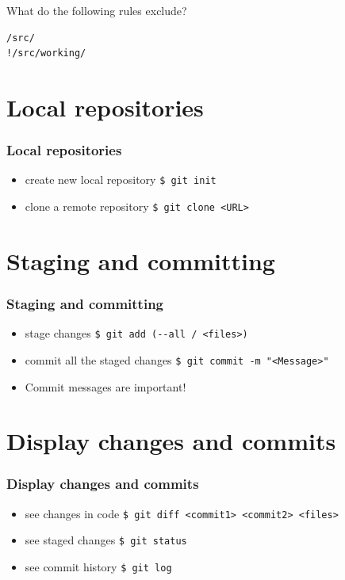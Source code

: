 \documentclass{beamer}
\begin{document}
	\begin{frame}[fragile]
		\centering What do the following rules exclude?
		\begin{lstlisting}
/src/
!/src/working/
		\end{lstlisting}
	\end{frame}

	\section{Local repositories}
	\begin{frame}
		\frametitle{Local repositories}\pause
		\begin{itemize}
			\item create new local repository\newline
			\lstinline|$ git init| \pause
			\item clone a remote repository\newline
			\lstinline|$ git clone <URL>|
		\end{itemize}
	\end{frame}

	\section{Staging and committing}
	\begin{frame}
		\frametitle{Staging and committing}\pause
		\begin{itemize}
			\item stage changes\newline
			\lstinline|$ git add (--all / <files>)| \pause
			\item commit all the staged changes\newline
			\lstinline|$ git commit -m "<Message>"| \pause
			\item Commit messages are important!
		\end{itemize}
	\end{frame}

	\section{Display changes and commits}
	\begin{frame}
		\frametitle{Display changes and commits}\pause
		\begin{itemize}
			\item see changes in code\newline
			\lstinline|$ git diff <commit1> <commit2> <files>| \pause
			\item see staged changes\newline
			\lstinline|$ git status| \pause
			\item see commit history\newline
			\lstinline|$ git log|
		\end{itemize}
	\end{frame}
\end{document}
